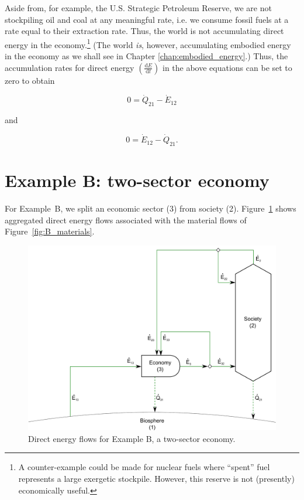 Aside from, for example, the U.S. 
Strategic Petroleum Reserve, 
we are not stockpiling oil and coal at any meaningful rate, 
i.e. we consume fossil fuels at a rate equal to their extraction rate. 
Thus, the world is not accumulating direct energy 
in the economy.\footnote{A counter-example could be made 
for nuclear fuels where ``spent'' fuel represents a large exergetic stockpile. 
However, this reserve is not (presently) economically useful.} 
(The world \emph{is}, however, 
accumulating embodied energy in the economy as we shall see 
in Chapter \ref{chap:embodied_energy}.) 
Thus, the accumulation rates for direct energy 
$\left( \frac{\mathrm{d}E}{\mathrm{d}t} \right)$ in the above equations 
can be set to zero to obtain

\begin{equation} \label{eq:biosphere_direct_energy_steady_state}
	0 = \dot{Q}_{21} - \dot{E}_{12}
\end{equation}

\noindent and

\begin{equation} \label{eq:single_sector_direct_energy_steady_state}
	0 = \dot{E}_{12} - \dot{Q}_{21}.
\end{equation}


\section{Example B: two-sector economy}
\label{sec:B_energy}

For Example~B, we split an economic sector (3) from 
society (2). Figure~\ref{fig:B_energy} shows aggregated
direct energy flows associated with the material flows of Figure~\ref{fig:B_materials}.

\begin{figure}[h!]
\centering
\includegraphics[width=0.8\linewidth]{Part_2/Chapter_Energy/images/2_sector_direct_energy.pdf}
\caption{Direct energy flows for Example B, a two-sector economy.}
\label{fig:B_energy}
\end{figure}


